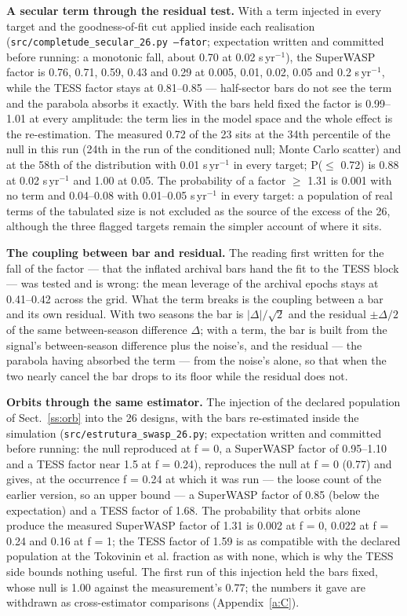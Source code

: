 \documentclass{aa}
\begin{document}
\textbf{A secular term through the residual test.} With a term injected in every target and the goodness-of-fit cut applied inside each realisation (\texttt{src/\allowbreak completude\_\allowbreak secular\_\allowbreak 26.py --fator}; expectation written and committed before running: a monotonic fall, about 0.70 at 0.02 s\,yr$^{-1}$), the SuperWASP factor is 0.76, 0.71, 0.59, 0.43 and 0.29 at 0.005, 0.01, 0.02, 0.05 and 0.2 s\,yr$^{-1}$, while the TESS factor stays at 0.81--0.85 --- half-sector bars do not see the term and the parabola absorbs it exactly. With the bars held fixed the factor is 0.99--1.01 at every amplitude: the term lies in the model space and the whole effect is the re-estimation. The measured 0.72 of the 23 sits at the 34th percentile of the null in this run (24th in the run of the conditioned null; Monte Carlo scatter) and at the 58th of the distribution with 0.01 s\,yr$^{-1}$ in every target; P($\le$ 0.72) is 0.88 at 0.02 s\,yr$^{-1}$ and 1.00 at 0.05. The probability of a factor $\ge$ 1.31 is 0.001 with no term and 0.04--0.08 with 0.01--0.05 s\,yr$^{-1}$ in every target: a population of real terms of the tabulated size is not excluded as the source of the excess of the 26, although the three flagged targets remain the simpler account of where it sits.

\textbf{The coupling between bar and residual.} The reading first written for the fall of the factor --- that the inflated archival bars hand the fit to the TESS block --- was tested and is wrong: the mean leverage of the archival epochs stays at 0.41--0.42 across the grid. What the term breaks is the coupling between a bar and its own residual. With two seasons the bar is $|\Delta|/\sqrt{2}$ and the residual $\pm\Delta/2$ of the same between-season difference $\Delta$; with a term, the bar is built from the signal's between-season difference plus the noise's, and the residual --- the parabola having absorbed the term --- from the noise's alone, so that when the two nearly cancel the bar drops to its floor while the residual does not.

\textbf{Orbits through the same estimator.} The injection of the declared population of Sect.~\ref{ss:orb} into the 26 designs, with the bars re-estimated inside the simulation (\texttt{src/\allowbreak estrutura\_\allowbreak swasp\_\allowbreak 26.py}; expectation written and committed before running: the null reproduced at f = 0, a SuperWASP factor of 0.95--1.10 and a TESS factor near 1.5 at f = 0.24), reproduces the null at f = 0 (0.77) and gives, at the occurrence f = 0.24 at which it was run --- the loose count of the earlier version, so an upper bound --- a SuperWASP factor of 0.85 (below the expectation) and a TESS factor of 1.68. The probability that orbits alone produce the measured SuperWASP factor of 1.31 is 0.002 at f = 0, 0.022 at f = 0.24 and 0.16 at f = 1; the TESS factor of 1.59 is as compatible with the declared population at the Tokovinin et al. fraction as with none, which is why the TESS side bounds nothing useful. The first run of this injection held the bars fixed, whose null is 1.00 against the measurement's 0.77; the numbers it gave are withdrawn as cross-estimator comparisons (Appendix~\ref{a:C}).
\end{document}
